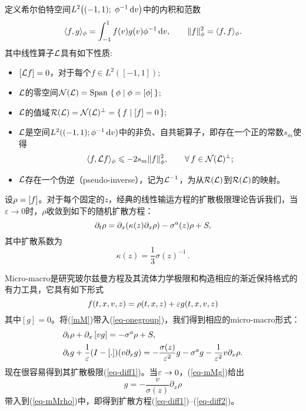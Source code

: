 定义希尔伯特空间$L^2\big((-1,1);\;\phi^{-1}\diff v\big)$中的内积和范数
\begin{equation}
  \langle f, g \rangle_{\phi} = \int_{-1}^1 f(v) g(v) \phi^{-1}\diff v, \qquad
  \| f \|_{\phi}^2 = \langle f, f \rangle_{\phi}.
\end{equation}
其中线性算子${\cal L}$具有如下性质:
\begin{itemize}
  \item $\av{{\cal L} f} =0$，对于每个$f\in L^2([-1,1])$;
  \item $\cal L$的零空间${\cal N} ({\cal L}) = \mbox{Span } \{\,\phi\mid
  \phi=\av{\phi}\,\}$;
  \item $\cal L$的值域${\cal R} ({\cal L}) = {\cal N} ({\cal L})^{\bot}=\{\,f\mid [f]=0\, \} ;$
  \item ${\cal L}$是空间$L^2((-1,1); \phi^{-1}\diff v)$中的非负、自共轭算子，即存在一个正的常数$s_m$使得
  \begin{equation}
    \langle f, {\cal L} f\rangle_{\phi} \le - 2 s_m \| f\|^2_{\phi},\qquad \forall\, f\in {\cal N} ({\cal L})^{\bot};
  \end{equation}
  \item ${\cal L}$存在一个伪逆（pseudo-inverse），记为${\cal L}^{-1}$，为从${\cal R} ({\cal L})$到${\cal R} ({\cal L})$的映射。
\end{itemize}

设$\rho = \av{f}$。对于每个固定的$z$，经典的线性输运方程的扩散极限理论告诉我们，当$\varepsilon \to 0$时，$\rho$收敛到如下的随机扩散方程：
\begin{equation} \label{eq-diff1}
  \dt \rho =  \partial_{x} (\kappa(z)  \partial_{x}\rho)-\sigma^a(z) \rho +S,
\end{equation}
其中扩散系数为
\begin{equation} \label{eq-diff2}
  \kappa(z) =\frac{1}{3} \sigma(z)^{-1}\,.
\end{equation}



Micro-macro是研究玻尔兹曼方程及其流体力学极限和构造相应的渐近保持格式的有力工具，它具有如下形式
\begin{equation}
\label{mM}
 f(t,x,v,z) = \rho(t,x,z) + \eps g(t,x,v,z)
\end{equation}
其中$[g]=0$。将(\ref{mM})带入(\ref{eq-onegroup})，我们得到相应的micro-macro形式：
\begin{subequations} \label{eq-mM}
  \begin{align}
    & \dt \rho + \dx\av{vg} = -\sigma^a \rho + S ,\label{eq-mMrho}  \\
    & \dt g + \frac{1}{\eps} (I-\av{.}) (v\dx g) = -\frac{\sigma(z)}{\eps^2}g - \sigma^a g - \frac{1}{\eps^2}v \dx\rho.\label{eq-mMg}
  \end{align}
\end{subequations}
现在很容易得到其扩散极限(\ref{eq-diff1})。当$\eps \to 0$，(\ref{eq-mMg})给出
$$
  g = - \frac{v}{\sigma(z)} \partial_x \rho
$$
带入到(\ref{eq-mMrho})中，即得到扩散方程(\ref{eq-diff1})--(\ref{eq-diff2})。

